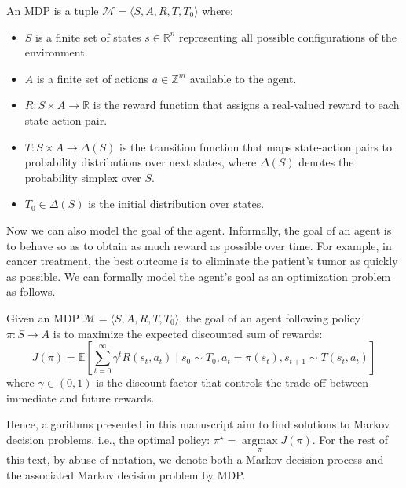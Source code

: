 \begin{definition} An MDP is a tuple $\mathcal{M} = \langle S, A, R, T, T_0 \rangle$ where:
\begin{itemize}
\item $S$ is a finite set of states $s \in \mathbb{R}^n$ representing all possible configurations of the environment.
\item $A$ is a finite set of actions $a \in \mathbb{Z}^m$ available to the agent.
\item $R: S \times A \rightarrow \mathbb{R}$ is the reward function that assigns a real-valued reward to each state-action pair.
\item $T: S \times A \rightarrow \Delta(S)$ is the transition function that maps state-action pairs to probability distributions over next states, where $\Delta(S)$ denotes the probability simplex over $S$.
\item $T_0 \in \Delta(S)$ is the initial distribution over states.
\end{itemize}
\end{definition}

Now we can also model the goal of the agent. Informally, the goal of an agent is to behave so as to obtain as much reward as possible over time. For example, in cancer treatment, the best outcome is to eliminate the patient's tumor as quickly as possible. We can formally model the agent's goal as an optimization problem as follows.

\begin{definition} Given an MDP $\mathcal{M}=\langle S, A, R, T, T_0 \rangle$, the goal of an agent following policy $\pi: S \rightarrow A$ is to maximize the expected discounted sum of rewards:
$$J(\pi) = \mathbb{E}\left[\sum_{t=0}^{\infty} \gamma^t R(s_t, a_t) \mid s_0 \sim T_0, a_t = \pi(s_t), s_{t+1} \sim T(s_t, a_t)\right]$$
where $\gamma \in (0,1)$ is the discount factor that controls the trade-off between immediate and future rewards.
\end{definition}

Hence, algorithms presented in this manuscript aim to find solutions to Markov decision problems, i.e., the optimal policy: $\pi^\star =\underset{\pi}{\operatorname{argmax}}J(\pi)$.
For the rest of this text, by abuse of notation, we denote both a Markov decision process and the associated Markov decision problem by MDP.

